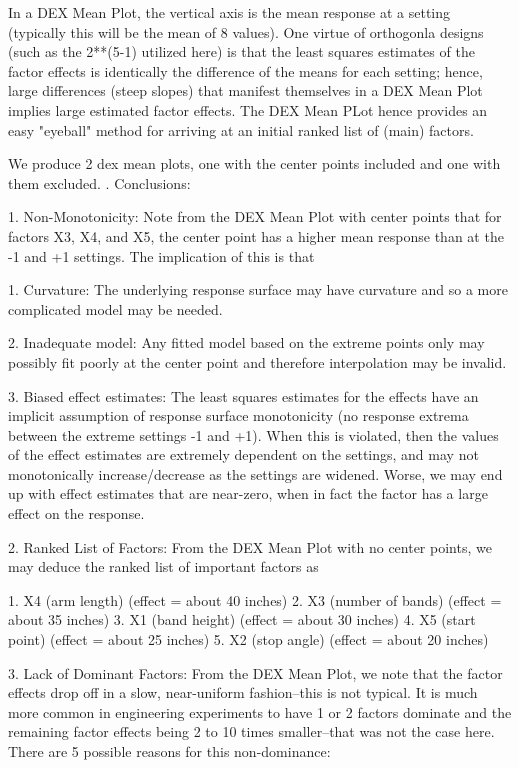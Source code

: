 In a DEX Mean Plot, the vertical axis is the mean response at a setting
(typically this will be the mean of 8 values).
One virtue of orthogonla designs (such as the 2**(5-1) utilized here)
is that the least squares estimates
of the factor effects is identically the difference of the means for
each setting; hence, large differences (steep slopes) that manifest themselves
in a DEX Mean Plot implies large estimated factor effects.
The DEX Mean PLot hence provides an easy "eyeball" method for arriving
at an initial ranked list of (main) factors.

We produce 2 dex mean plots, one with the center points included
and one with them excluded.
.
Conclusions:

1. Non-Monotonicity: Note from the DEX Mean Plot with center points
   that for factors X3, X4, and X5, the center point has a higher
   mean response than at the -1 and +1 settings.
   The implication of this is that

      1. Curvature: The underlying response surface
         may have curvature and so a more complicated
         model may be needed.

      2. Inadequate model: Any fitted model based
         on the extreme points only may possibly
         fit poorly at the center point and
         therefore interpolation may be invalid.

      3. Biased effect estimates: The least
         squares estimates for the effects have an
         implicit assumption of response surface
         monotonicity (no response extrema between
         the extreme settings -1 and +1).  When
         this is violated, then the values of the
         effect estimates are extremely dependent
         on the settings, and may not
         monotonically increase/decrease as the
         settings are widened.  Worse, we may end
         up with effect estimates that are
         near-zero, when in fact the factor has a
         large effect on the response.

2. Ranked List of Factors: From the DEX Mean Plot with no center points,
   we may deduce the ranked list of important factors as

      1. X4 (arm length)      (effect = about 40 inches)
      2. X3 (number of bands) (effect = about 35 inches)
      3. X1 (band height)     (effect = about 30 inches)
      4. X5 (start point)     (effect = about 25 inches)
      5. X2 (stop angle)      (effect = about 20 inches)

3. Lack of Dominant Factors: From the DEX Mean
   Plot, we note that the factor effects drop off
   in a slow, near-uniform fashion--this is not
   typical.  It is much more common in engineering
   experiments to have 1 or 2 factors dominate and
   the remaining factor effects being 2 to 10
   times smaller--that was not the case here.
   There are 5 possible reasons for this
   non-dominance:


